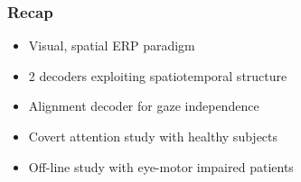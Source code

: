 \documentclass{kul-ulille-beamer}
\begin{document}
%    
%    
%
%
\begin{frame}
  \frametitle{Recap}
  \begin{changemargin}
  \begin{itemize}
    \item Visual, spatial ERP paradigm
    \item 2 decoders exploiting spatiotemporal structure
    \item Alignment decoder for gaze independence
    \item Covert attention study with healthy subjects
    \item Off-line study with eye-motor impaired patients
  \end{itemize}
  \end{changemargin}
\end{frame}
\end{document}
